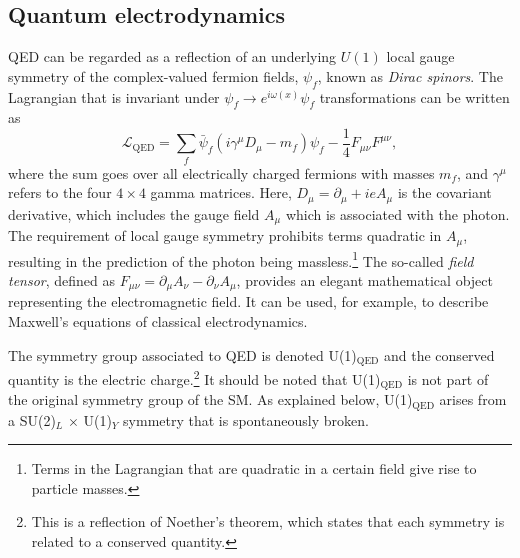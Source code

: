 \subsection{Quantum electrodynamics}
\label{subsec:qed}
QED can be regarded as a reflection of an underlying $U(1)$ local gauge symmetry of the complex-valued fermion fields, $\psi_f$, known as \emph{Dirac spinors}.
The Lagrangian that is invariant under $\psi_f \rightarrow e^{i \omega(x)} \psi_f$ transformations can be written as
\begin{equation}
  \mathcal{L}_{\text{QED}} = \sum_f \bar{\psi}_f(i\gamma^\mu D_\mu - m_f)\psi_f - \frac{1}{4}F_{\mu\nu}F^{\mu\nu},
  \label{eq:Lagrangianqed}
\end{equation}
where the sum goes over all electrically charged fermions with masses $m_f$, and $\gamma^\mu$ refers to the four $4 \times 4$ gamma matrices.
Here, $D_\mu = \partial_\mu + ieA_\mu$ is the covariant derivative, which includes the gauge field $A_\mu$ which is associated with the photon. The requirement of local gauge symmetry prohibits terms quadratic in $A_\mu$, resulting in the prediction of the photon being massless.\footnote{Terms in the Lagrangian that are quadratic in a certain field give rise to particle masses.}
The so-called \emph{field tensor}, defined as $F_{\mu\nu} = \partial_\mu A_\nu - \partial_\nu A_\mu$, provides an elegant mathematical object representing the electromagnetic field. It can be used, for example, to describe Maxwell's equations of classical electrodynamics.

The symmetry group associated to QED is denoted U(1)$_{\text{QED}}$ and the conserved quantity is the electric charge.\footnote{This is a reflection of Noether's theorem, which states that each symmetry is related to a conserved quantity.}
It should be noted that U(1)$_{\text{QED}}$ is not part of the original symmetry group of the SM. As explained below, U(1)$_{\text{QED}}$ arises from a SU(2)$_L$ $\times$ U(1)$_Y$ symmetry that is spontaneously broken.


